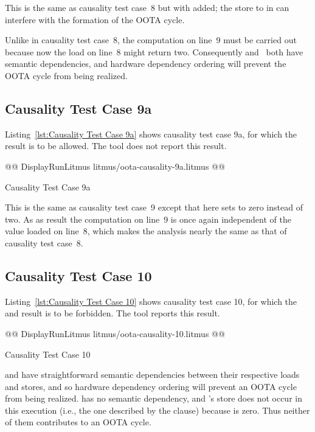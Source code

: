 \documentclass[10]{article}
\begin{document}
This is the same as causality test case~8 but with  added;
the store to  in  can interfere with the formation of the
OOTA cycle.

Unlike in causality test case~8, the computation on line~9 must be
carried out because now the load on line~8 might return two.
Consequently  and~ both have semantic dependencies,
and hardware dependency ordering will prevent the OOTA cycle from
being realized.

\subsection{Causality Test Case 9a}
\label{app:Causality Test Case 9a}

Listing~\ref{lst:Causality Test Case 9a}
shows causality test case 9a, for which the 
result is to be allowed.
The  tool does not report this result.

\begin{listing}[tbp]
@@ DisplayRunLitmus litmus/oota-causality-9a.litmus @@
\caption{Causality Test Case 9a}
\label{lst:Causality Test Case 9a}
\end{listing}

This is the same as causality test case~9 except that here 
sets  to zero instead of two.
As as result the computation on line~9 is once again independent of
the value loaded on line~8, which makes the analysis nearly the same
as that of causality test case~8.

\subsection{Causality Test Case 10}
\label{app:Causality Test Case 10}

Listing~\ref{lst:Causality Test Case 10}
shows causality test case 10, for which the  and 
result is to be forbidden.
The  tool reports this result.

\begin{listing}[tbp]
@@ DisplayRunLitmus litmus/oota-causality-10.litmus @@
\caption{Causality Test Case 10}
\label{lst:Causality Test Case 10}
\end{listing}

 and  have straightforward
semantic dependencies between their respective loads and stores, and
so hardware dependency ordering will prevent an OOTA cycle from being
realized.
 has no semantic dependency, and 's store does not
occur in this execution (i.e., the one described by the  clause)
because  is zero.
Thus neither of them contributes to an OOTA cycle.
\end{document}
